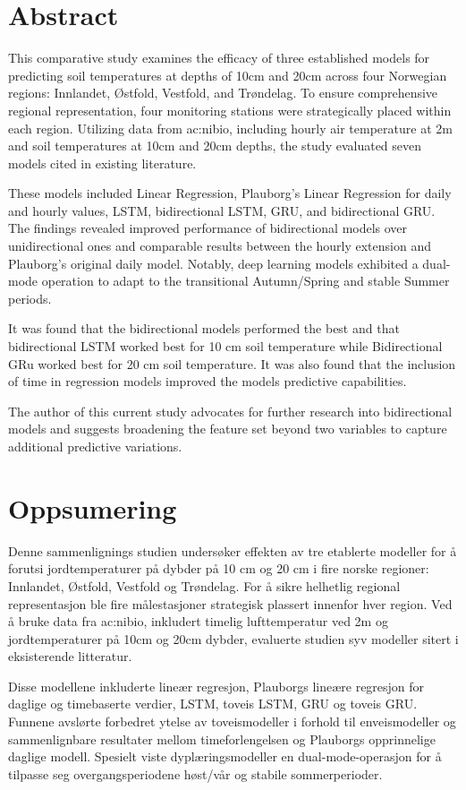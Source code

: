 
\section*{Abstract}
This comparative study examines the efficacy of three established models for predicting soil temperatures at depths of 10cm and 20cm across four Norwegian regions: Innlandet, Østfold, Vestfold, and Trøndelag. To ensure comprehensive regional representation, four monitoring stations were strategically placed within each region. Utilizing data from \acrshort{ac:nibio}, including hourly air temperature at 2m and soil temperatures at 10cm and 20cm depths, the study evaluated seven models cited in existing literature.

These models included Linear Regression, Plauborg’s Linear Regression for daily and hourly values, LSTM, bidirectional LSTM, GRU, and bidirectional GRU. The findings revealed improved performance of bidirectional models over unidirectional ones and comparable results between the hourly extension and Plauborg’s original daily model. Notably, deep learning models exhibited a dual-mode operation to adapt to the transitional Autumn/Spring and stable Summer periods.

It was found that the bidirectional models performed the best and that bidirectional LSTM worked best for 10 cm soil temperature while Bidirectional GRu worked best for 20 cm soil temperature. It was also found that the inclusion of time in regression models improved the models predictive capabilities.

The author of this current study advocates for further research into bidirectional models and suggests broadening the feature set beyond two variables to capture additional predictive variations.

\section*{Oppsumering}
Denne sammenlignings studien undersøker effekten av tre etablerte modeller for å forutsi jordtemperaturer på dybder på 10 cm og 20 cm i fire norske regioner: Innlandet, Østfold, Vestfold og Trøndelag. For å sikre helhetlig regional representasjon ble fire målestasjoner strategisk plassert innenfor hver region. Ved å bruke data fra \acrshort{ac:nibio}, inkludert timelig lufttemperatur ved 2m og jordtemperaturer på 10cm og 20cm dybder, evaluerte studien syv modeller sitert i eksisterende litteratur.

Disse modellene inkluderte lineær regresjon, Plauborgs lineære regresjon for daglige og timebaserte verdier, LSTM, toveis LSTM, GRU og toveis GRU. Funnene avslørte forbedret ytelse av toveismodeller i forhold til enveismodeller og sammenlignbare resultater mellom timeforlengelsen og Plauborgs opprinnelige daglige modell. Spesielt viste dyplæringsmodeller en dual-mode-operasjon for å tilpasse seg overgangsperiodene høst/vår og stabile sommerperioder.

